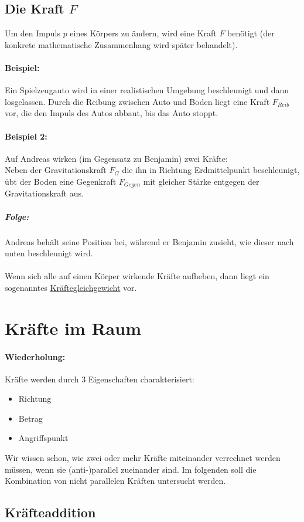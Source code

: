\documentclass[12pt]{article}
\numberwithin{equation}{subsection}
\begin{document}
	\subsection{Die Kraft $F$}
	Um den Impuls $ p $ eines Körpers zu ändern, wird eine Kraft $ F $ benötigt (der konkrete mathematische Zusammenhang wird später behandelt).
	\paragraph{Beispiel:}
	Ein Spielzeugauto wird in einer realistischen Umgebung beschleunigt und dann losgelassen.
	Durch die Reibung zwischen Auto und Boden liegt eine Kraft $ F_{Reib} $ vor, die den Impuls des Autos abbaut, bis das Auto stoppt.
	\paragraph{Beispiel 2:}
	Auf Andreas wirken (im Gegensatz zu Benjamin) zwei Kräfte:\\
	Neben der Gravitationskraft $ F_G $ die ihn in Richtung Erdmittelpunkt beschleunigt, übt der Boden eine Gegenkraft $ F_{Gegen} $ mit gleicher Stärke entgegen der Gravitationskraft aus.
	\subparagraph{Folge:}
	Andreas behält seine Position bei, während er Benjamin zusieht, wie dieser nach unten beschleunigt wird.\\\\
	Wenn sich alle auf einen Körper wirkende Kräfte aufheben, dann liegt ein sogenanntes \underline{Kräftegleichgewicht} vor.
	
	\section{Kräfte im Raum}
	\paragraph{Wiederholung:}
	Kräfte werden durch 3 Eigenschaften charakterisiert:
	\begin{itemize}
		\item Richtung
		\item Betrag
		\item Angriffspunkt
	\end{itemize}
	Wir wissen schon, wie zwei oder mehr Kräfte miteinander verrechnet werden müssen, wenn sie (anti-)parallel zueinander sind. Im folgenden soll die Kombination von nicht parallelen Kräften untersucht werden.
	
	\subsection{Kräfteaddition}
\end{document}
